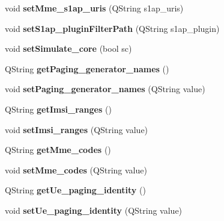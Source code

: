 \begin{DoxyCompactItemize}
\item 
void {\bfseries set\+Mme\+\_\+s1ap\+\_\+uris} (Q\+String s1ap\+\_\+uris)\hypertarget{class_mme_a022386b6c048e49e495d1d43eceb0693}{}\label{class_mme_a022386b6c048e49e495d1d43eceb0693}

\item 
void {\bfseries set\+S1ap\+\_\+plugin\+Filter\+Path} (Q\+String s1ap\+\_\+plugin)\hypertarget{class_mme_a1d6a026dd55bbf87b2e7f9aeebf77e9d}{}\label{class_mme_a1d6a026dd55bbf87b2e7f9aeebf77e9d}

\item 
void {\bfseries set\+Simulate\+\_\+core} (bool sc)\hypertarget{class_mme_a61e4b68a4dc4bc1115d3965f2fd65a9a}{}\label{class_mme_a61e4b68a4dc4bc1115d3965f2fd65a9a}

\item 
Q\+String {\bfseries get\+Paging\+\_\+generator\+\_\+names} ()\hypertarget{class_mme_ac7f9fb17f2ed358ed5b18d08b46e1ef2}{}\label{class_mme_ac7f9fb17f2ed358ed5b18d08b46e1ef2}

\item 
void {\bfseries set\+Paging\+\_\+generator\+\_\+names} (Q\+String value)\hypertarget{class_mme_a4b95d606ec01b06d33dc8baf2c0dfa48}{}\label{class_mme_a4b95d606ec01b06d33dc8baf2c0dfa48}

\item 
Q\+String {\bfseries get\+Imsi\+\_\+ranges} ()\hypertarget{class_mme_ac20bd4ef411e1a0cd5719cb3ab0f81a7}{}\label{class_mme_ac20bd4ef411e1a0cd5719cb3ab0f81a7}

\item 
void {\bfseries set\+Imsi\+\_\+ranges} (Q\+String value)\hypertarget{class_mme_a37b9d3395c453afbc7a193c8cd7e13a9}{}\label{class_mme_a37b9d3395c453afbc7a193c8cd7e13a9}

\item 
Q\+String {\bfseries get\+Mme\+\_\+codes} ()\hypertarget{class_mme_a1f5021e21250635f6f18687d84463be8}{}\label{class_mme_a1f5021e21250635f6f18687d84463be8}

\item 
void {\bfseries set\+Mme\+\_\+codes} (Q\+String value)\hypertarget{class_mme_a03ac77d1ae699257e2f1eec251be16aa}{}\label{class_mme_a03ac77d1ae699257e2f1eec251be16aa}

\item 
Q\+String {\bfseries get\+Ue\+\_\+paging\+\_\+identity} ()\hypertarget{class_mme_a413712c25c6a1dcfad9f68c55ba6fd12}{}\label{class_mme_a413712c25c6a1dcfad9f68c55ba6fd12}

\item 
void {\bfseries set\+Ue\+\_\+paging\+\_\+identity} (Q\+String value)\hypertarget{class_mme_ae854733d8c4c0ecdb19f6abad925dee5}{}\label{class_mme_ae854733d8c4c0ecdb19f6abad925dee5}


\end{DoxyCompactItemize}

